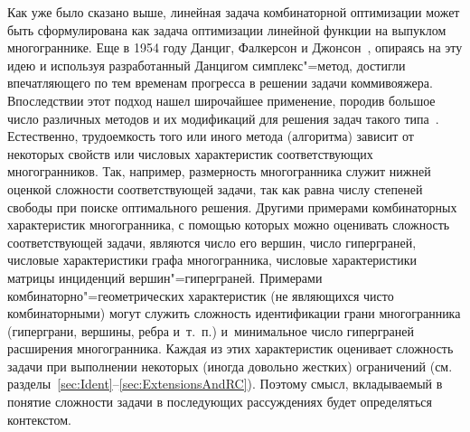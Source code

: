 Как уже было сказано выше, линейная задача комбинаторной оптимизации может быть сформулирована как задача оптимизации линейной функции на выпуклом многограннике.
Еще в 1954 году Данциг, Фалкерсон и Джонсон~\cite{DantzigFJ:1954}, опираясь на эту идею и используя разработанный Данцигом симплекс"=метод, достигли впечатляющего по тем временам прогресса в решении задачи коммивояжера.
Впоследствии этот подход нашел широчайшее применение, породив большое число различных методов и их модификаций для решения задач такого типа~\cite{SchrijverCO:2003}.
Естественно, трудоемкость того или иного метода (алгоритма) зависит от некоторых свойств или числовых характеристик соответствующих многогранников.
Так, например, размерность многогранника служит нижней оценкой сложности соответствующей задачи, так как равна числу степеней свободы при поиске оптимального решения.
Другими примерами комбинаторных характеристик многогранника, с помощью которых можно оценивать сложность соответствующей задачи, являются число его вершин, число гиперграней, числовые характеристики графа многогранника, числовые характеристики матрицы инциденций вершин"=гиперграней.
Примерами комбинаторно"=геометрических характеристик (не являющихся чисто комбинаторными) могут служить сложность идентификации грани многогранника (гиперграни, вершины, ребра и~т.~п.) %
и~минимальное число гиперграней расширения многогранника.
Каждая из этих характеристик оценивает сложность задачи при выполнении некоторых (иногда довольно жестких) ограничений (см. разделы~\ref{sec:Ident}--\ref{sec:ExtensionsAndRC}). Поэтому смысл, вкладываемый в понятие сложности задачи в последующих рассуждениях будет определяться контекстом.


